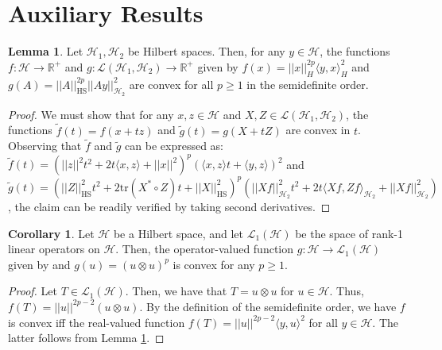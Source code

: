 \documentclass[accepted]{article}
\theoremstyle{definition}
\newtheorem{lemma}[theorem]{Lemma}
\newtheorem{corollary}{Corollary}[theorem]
\begin{document}
\section{Auxiliary Results}
\label{Auxiliary Proofs}
\begin{lemma}
\label{Convexity Result}
Let $\mathcal{H}_1, \mathcal{H}_2$ be Hilbert spaces. Then, for any $y \in \mathcal{H}$, the functions $f: \mathcal{H} \to \mathbb{R}^{+}$ and $g: \mathcal{L}(\mathcal{H}_1, \mathcal{H}_2) \to \mathbb{R}^{+}$ given by $f(x) = ||x||_{H}^{2p}\langle y, x \rangle^2_{H}$ and $g(A) = ||A||^{2p}_{\text{HS}} ||Ay||^2_{\mathcal{H}_2}$ are convex for all $p \geq 1$ in the semidefinite order.
\end{lemma}
\begin{proof}
We must show that for any $x, z \in \mathcal{H}$ and $X, Z \in \mathcal{L}(\mathcal{H}_1, \mathcal{H}_2)$, the functions $\tilde{f}(t) = f(x + tz)$ and $\tilde{g}(t) = g(X + tZ)$ are convex in $t$. Observing that $\tilde{f}$ and $\tilde{g}$ can be expressed as: $\tilde{f}(t) = (||z||^2 t^2 + 2t \langle x, z \rangle + ||x||^2)^{p}(\langle x, z \rangle t +  \langle y, z \rangle)^2$ and $\tilde{g}(t) = (||Z||_{\text{HS}}^2 t^2 + 2\text{tr}(X^{*} \circ Z)t   + ||X||_{\text{HS}}^2)^{p}(||Xf||^2_{\mathcal{H}_2}t^2 + 2t\langle Xf, Zf \rangle_{\mathcal{H}_2} + ||Xf||^2_{\mathcal{H}_2})$, the claim can be readily verified by taking second derivatives.
\end{proof}
\begin{corollary}
\label{Matrix Convexity}
Let $\mathcal{H}$ be a Hilbert space, and let $\mathcal{L}_1(\mathcal{H})$ be the space of rank-1 linear operators on $\mathcal{H}$. Then, the operator-valued function $g: \mathcal{H} \to \mathcal{L}_1(\mathcal{H})$ given by and $g(u) = (u \otimes u)^{p}$ is convex for any $p \geq 1$.
\end{corollary}
\begin{proof}
Let $T \in \mathcal{L}_1(\mathcal{H})$. Then, we have that $T = u \otimes u$ for $u \in \mathcal{H}$. Thus, $f(T) = ||u||^{2p - 2}(u \otimes u)$. By the definition of the semidefinite order, we have $f$ is convex iff the real-valued function $f(T) = ||u||^{2p-2}\langle y, u \rangle^2$ for all $y \in \mathcal{H}$. The latter follows from Lemma \ref{Convexity Result}. 
\end{proof}
\end{document}
